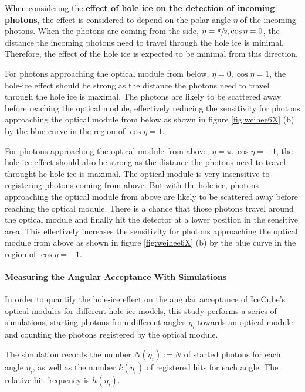 \label{sec:hole_ice_effects}
When considering the \textbf{effect of hole ice on the detection of incoming photons}, the effect is considered to depend on the polar angle $\eta$ of the incoming photons. When the photons are coming from the side, $\eta = \sfrac{\pi}{2}, \cos \eta = 0$, the distance the incoming photons need to travel through the hole ice is minimal. Therefore, the effect of the hole ice is expected to be minimal from this direction.

For photons approaching the optical module from below, $\eta = 0, \cos \eta = 1$, the hole-ice effect should be strong as the distance the photons need to travel through the hole ice is maximal. The photons are likely to be scattered away before reaching the optical module, effectively reducing the sensitivity for photons approaching the optical module from below as shown in figure \ref{fig:weihee6X} (b) by the blue curve in the region of $\cos \eta = 1$.

For photons approaching the optical module from above, $\eta = \pi, \cos \eta = -1$, the hole-ice effect should also be strong as the distance the photons need to travel throught he hole ice is maximal. The optical module is very insensitive to registering photons coming from above. But with the hole ice, photons approaching the optical module from above are likely to be scattered away before reaching the optical module. There is a chance that those photons travel around the optical module and finally hit the detector at a lower position in the sensitive area. This effectively increases the sensitivity for photons approaching the optical module from above as shown in figure \ref{fig:weihee6X} (b) by the blue curve in the region of $\cos \eta = -1$.


\paragraph{Measuring the Angular Acceptance With Simulations}
In order to quantify the hole-ice effect on the angular acceptance of IceCube's optical modules for different hole ice models, this study performs a series of simulations, starting photons from different angles $\eta_i$ towards an optical module and counting the photons registered by the optical module.

The simulation records the number $N(\eta_i):= N$ of started photons for each angle $\eta_i$, as well as the number $k(\eta_i)$ of registered hits for each angle. The relative hit frequency is $h(\eta_i)$.

